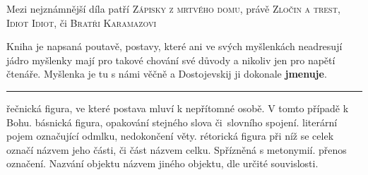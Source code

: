 \documentclass[FGBook.tex]{subfiles}
\begin{document}

\noindent 
Mezi nejznámnější díla patří \textsc{Zápisky z mrtvého domu}, právě \textsc{Zločin a trest}, \textsc{Idiot Idiot}, či \textsc{Bratři Karamazovi}






\noindent 
Kniha je napsaná poutavě, postavy, které ani ve svých myšlenkách neadresují jádro myšlenky mají pro takové chování své důvody a nikoliv jen pro napětí čtenáře.
Myšlenka je tu s námi věčně a Dostojevskij ji dokonale \textbf{jmenuje}.

\vfill

\noindent\begin{minipage}{\textwidth}
    {\textcolor{\wpagecolor}{\rule{\linewidth}{0.4pt}}
    \footnotesize
     řečnická figura, ve které postava mluví k nepřítomné osobě.
    V tomto případě k Bohu.
     básnická figura, opakování stejného slova či~slovního spojení. 
     literární pojem označující odmlku, nedokončení věty.
     rétorická figura při níž se celek označí názvem jeho části, či část názvem celku.
    Spřízněná s metonymií.
     přenos označení.
    Nazvání objektu názvem jiného objektu, dle určité souvislosti.
    }
\end{minipage}

\newpage
\end{document}
